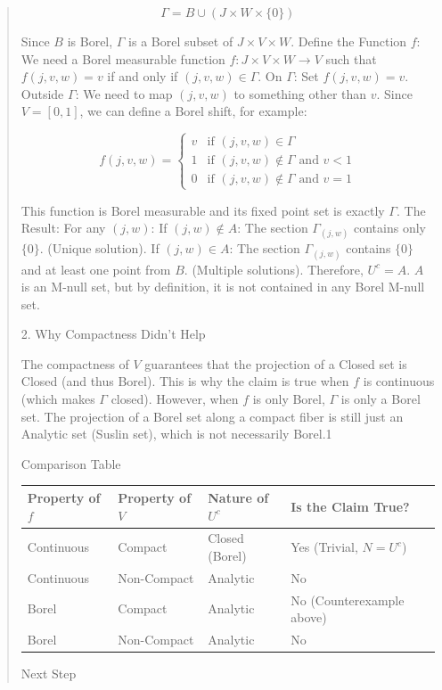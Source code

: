 \begin{Rem}
{\begin{quote}
$$\Gamma = B \cup \left( J \times W \times \{0\} \right)$$

Since $B$ is Borel, $\Gamma$ is a Borel subset of $J \times V \times W$.
Define the Function $f$:
We need a Borel measurable function $f: J \times V \times W \to V$ such that $f(j,v,w) = v$ if and only if $(j,v,w) \in \Gamma$.
On $\Gamma$: Set $f(j,v,w) = v$.
Outside $\Gamma$: We need to map $(j,v,w)$ to something other than $v$. Since $V = [0,1]$, we can define a Borel shift, for example:

$$f(j,v,w) = \begin{cases} v & \text{if } (j,v,w) \in \Gamma \\ 1 & \text{if } (j,v,w) \notin \Gamma \text{ and } v < 1 \\ 0 & \text{if } (j,v,w) \notin \Gamma \text{ and } v = 1 \end{cases}$$

This function is Borel measurable and its fixed point set is exactly $\Gamma$.
The Result:
For any $(j,w)$:
If $(j,w) \notin A$: The section $\Gamma_{(j,w)}$ contains only $\{0\}$. (Unique solution).
If $(j,w) \in A$: The section $\Gamma_{(j,w)}$ contains $\{0\}$ and at least one point from $B$. (Multiple solutions).
Therefore, $U^c = A$.
$A$ is an M-null set, but by definition, it is not contained in any Borel M-null set.

2. Why Compactness Didn't Help

The compactness of $V$ guarantees that the projection of a Closed set is Closed (and thus Borel). This is why the claim is true when $f$ is continuous (which makes $\Gamma$ closed).
However, when $f$ is only Borel, $\Gamma$ is only a Borel set. The projection of a Borel set along a compact fiber is still just an Analytic set (Suslin set), which is not necessarily Borel.1

Comparison Table

\begin{tabular}{llll}
Property of $f$ & Property of $V$ & Nature of $U^c$ & Is the Claim True? \\
\hline
Continuous & Compact & Closed (Borel) & Yes (Trivial, $N=U^c$) \\
Continuous & Non-Compact & Analytic & No \\
Borel & Compact & Analytic & No (Counterexample above) \\
Borel & Non-Compact & Analytic & No \\
\end{tabular}

Next Step


\end{quote}}
\end{Rem}
